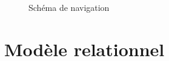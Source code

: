 \documentclass[a4paper,10pt,twoside]{sphinxmanual}
\begin{document}
\begin{figure}[htbp]
\centering
\capstart

\caption{Schéma de navigation}\end{figure}


\chapter{Modèle relationnel}
\label{models::doc}\label{models:modele-relationnel}
\end{document}
